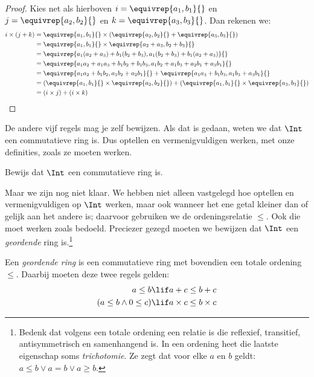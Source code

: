 \documentclass[../../../include/open-logic-section]{subfiles}
\begin{document}
\begin{proof}
Kies net als hierboven $i = \equivrep{a_1, b_1}{}$ en $j =
\equivrep{a_2,b_2}{}$ en $k = \equivrep{a_3, b_3}{}$. Dan rekenen we:
\begin{align*}
	i \times (j + k) 
	&= \equivrep{a_1, b_1}{} \times (\equivrep{a_2,b_2}{} + \equivrep{a_3, b_3}{})\\
	&= \equivrep{a_1, b_1}{} \times \equivrep{a_2 + a_3,b_2+b_3}{}\\
	&= \equivrep{a_1  (a_2 + a_3) + b_1  (b_2+b_3), a_1  (b_2 + b_3) + b_1 (a_2 + a_3)}{}\\
	&= \equivrep{a_1 a_2 + a_1a_3 + b_1 b_2+b_1b_3, a_1 b_2 + a_1b_3 + a_2b_1 + a_3b_1}{}\\		
	&= \equivrep{a_1a_2 + b_1b_2, a_1b_2 + a_2b_1}{} + \equivrep{a_1a_3 + b_1b_3, a_1b_3 + a_3b_1}{}\\
	&= (\equivrep{a_1, b_1}{} \times \equivrep{a_2,b_2}{}) + (\equivrep{a_1, b_1}{} \times  \equivrep{a_3, b_3}{})\\
	&= (i \times j) + (i \times k)
\end{align*}
\end{proof}
De andere vijf regels mag je zelf bewijzen. Als dat is gedaan, weten
we dat $\Int$ een commutatieve ring is. Dus optellen en
vermenigvuldigen werken, met onze definities, zoals ze moeten werken.
\begin{prob}
Bewijs dat $\Int$ een commutatieve ring is.
\end{prob}
Maar we zijn nog niet klaar. We hebben niet alleen vastgelegd hoe
optellen en vermenigvuldigen op $\Int$ werken, maar ook wanneer het
ene getal kleiner dan of gelijk aan het andere is; daarvoor gebruiken
we de ordeningsrelatie $\leq$. Ook die moet werken zoals bedoeld.
Preciezer gezegd moeten we bewijzen dat $\Int$ een \emph{geordende}
ring is.\footnote{Bedenk dat volgens
	 een totale ordening
	een relatie is die reflexief, transitief, antisymmetrisch en samenhangend is.
	In een ordening heet die laatste eigenschap soms
	\emph{trichotomie}. Ze zegt dat voor elke $a$ en $b$ geldt: $a \leq b \lor a
	= b \lor a \geq b$.} 
\begin{defn}
Een \emph{geordende ring} is een commutatieve ring met bovendien een
totale ordening $\leq$. Daarbij moeten deze twee regels gelden:
\begin{align*}
	a \leq b &\lif a + c \leq b + c\\
	(a \leq b \land 0 \leq c) &\lif a \times c \leq b \times c
\end{align*}
\end{defn}
\end{document}
